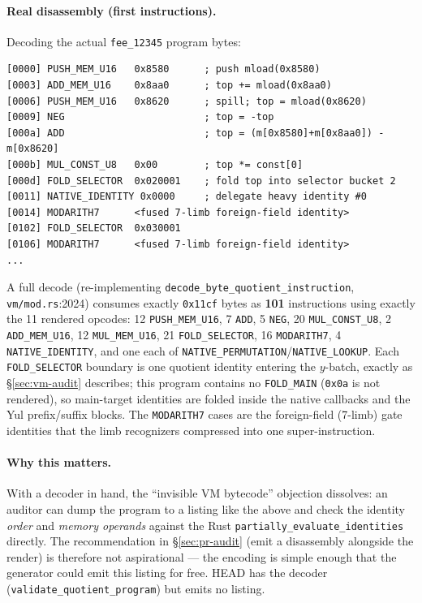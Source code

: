 \paragraph{Real disassembly (first instructions).} Decoding the actual
\texttt{fee\_12345} program bytes:
\begin{lstlisting}[style=plain]
[0000] PUSH_MEM_U16   0x8580      ; push mload(0x8580)
[0003] ADD_MEM_U16    0x8aa0      ; top += mload(0x8aa0)
[0006] PUSH_MEM_U16   0x8620      ; spill; top = mload(0x8620)
[0009] NEG                        ; top = -top
[000a] ADD                        ; top = (m[0x8580]+m[0x8aa0]) - m[0x8620]
[000b] MUL_CONST_U8   0x00        ; top *= const[0]
[000d] FOLD_SELECTOR  0x020001    ; fold top into selector bucket 2
[0011] NATIVE_IDENTITY 0x0000     ; delegate heavy identity #0
[0014] MODARITH7      <fused 7-limb foreign-field identity>
[0102] FOLD_SELECTOR  0x030001
[0106] MODARITH7      <fused 7-limb foreign-field identity>
...
\end{lstlisting}
A full decode (re-implementing \texttt{decode\_\allowbreak{}byte\_\allowbreak{}quotient\_\allowbreak{}instruction},
\texttt{vm/mod.rs}:2024) consumes exactly \texttt{0x11cf} bytes as
\textbf{101} instructions using exactly the 11 rendered opcodes:
12 \texttt{PUSH\_MEM\_U16}, 7 \texttt{ADD}, 5 \texttt{NEG},
20 \texttt{MUL\_CONST\_U8}, 2 \texttt{ADD\_MEM\_U16},
12 \texttt{MUL\_MEM\_U16}, 21 \texttt{FOLD\_SELECTOR},
16 \texttt{MODARITH7}, 4 \texttt{NATIVE\_IDENTITY}, and one each of
\texttt{NATIVE\_\allowbreak{}PERMUTATION}/\texttt{NATIVE\_LOOKUP}.
Each \texttt{FOLD\_SELECTOR} boundary is one
quotient identity entering the $y$-batch, exactly as
\S\ref{sec:vm-audit} describes; this program contains no
\texttt{FOLD\_MAIN} (\texttt{0x0a} is not rendered), so main-target
identities are folded inside the native callbacks and the Yul
prefix/suffix blocks. The \texttt{MODARITH7} cases are the
foreign-field (7-limb) gate identities that the limb recognizers
compressed into one super-instruction.

\paragraph{Why this matters.} With a decoder in hand, the ``invisible VM
bytecode'' objection dissolves: an auditor can dump the program to a
listing like the above and check the identity \emph{order} and
\emph{memory operands} against the Rust
\texttt{partially\_\allowbreak{}evaluate\_\allowbreak{}identities} directly. The recommendation
in \S\ref{sec:pr-audit} (emit a disassembly alongside the render) is
therefore not aspirational --- the encoding is simple enough that the
generator could emit this listing for free.  HEAD has the
decoder (\texttt{validate\_\allowbreak{}quotient\_\allowbreak{}program}) but emits no listing.

